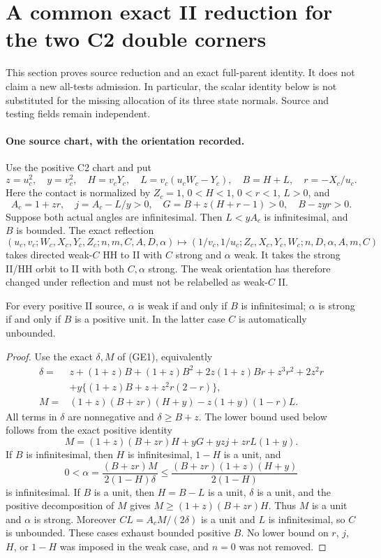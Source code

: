 \section{A common exact II reduction for the two C2 double corners}
\label{sec:r6-c2-double}

This section proves source reduction and an exact full-parent identity.
It does not claim a new all-tests admission.  In particular, the scalar
identity below is not substituted for the missing allocation of its
three state normals.  Source and testing fields remain independent.

\paragraph{One source chart, with the orientation recorded.}
Use the positive C2 chart and put
\[
 z=u_c^2,\quad y=v_c^2,\quad H=v_cY_c,\quad
 L=v_c(u_cW_c-Y_c),\quad B=H+L,\quad r=-X_c/u_c.
\]
Here the contact is normalized by $Z_c=1$, $0<H<1$, $0<r<1$,
$L>0$, and
\[
 A_c=1+zr,\quad j=A_c-L/y>0,\quad
 G=B+z(H+r-1)>0,\quad B-zyr>0.
\]
Suppose both actual angles are infinitesimal.  Then $L<yA_c$ is
infinitesimal, and $B$ is bounded.  The exact reflection
\[
 (u_c,v_c;W_c,X_c,Y_c,Z_c;n,m,C,A,D,\alpha)
 \mapsto(1/v_c,1/u_c;Z_c,X_c,Y_c,W_c;n,D,\alpha,A,m,C)
\]
takes directed weak-$C$ HH to II with $C$ strong and $\alpha$ weak.
It takes the strong II/HH orbit to II with both $C,\alpha$ strong.
The weak orientation has therefore changed under reflection and must
not be relabelled as weak-$C$ II.

\begin{proposition}
For every positive II source, $\alpha$ is weak if and only if $B$ is
infinitesimal; $\alpha$ is strong if and only if $B$ is a positive
unit.  In the latter case $C$ is automatically unbounded.
\end{proposition}
\begin{proof}
Use the exact $\delta,M$ of (GE1), equivalently
\[
\begin{split}
 \delta={}&z+(1+z)B+(1+z)B^2+2z(1+z)Br+z^3r^2+2z^2r\\
 &+y\{(1+z)B+z+z^2r(2-r)\},\\
 M={}&(1+z)(B+zr)(H+y)-z(1+y)(1-r)L.
\end{split}
\]
All terms in $\delta$ are nonnegative and $\delta\ge B+z$.
The lower bound used below follows from the exact positive identity
\[
 M=(1+z)(B+zr)H+yG+yzj+zrL(1+y).
\]
If $B$ is infinitesimal, then $H$ is infinitesimal, $1-H$ is a unit,
and
\[
 0<\alpha=\frac{(B+zr)M}{2(1-H)\delta}
 \le\frac{(B+zr)(1+z)(H+y)}{2(1-H)}
\]
is infinitesimal.  If $B$ is a unit, then $H=B-L$ is a unit,
$\delta$ is a unit, and the positive decomposition of $M$ gives
$M\ge(1+z)(B+zr)H$.  Thus $M$ is a unit and $\alpha$ is strong.
Moreover $CL=A_cM/(2\delta)$ is a unit and $L$ is infinitesimal,
so $C$ is unbounded.  These cases exhaust bounded positive $B$.
No lower bound on $r$, $j$, $H$, or $1-H$ was imposed in the weak
case, and $n=0$ was not removed.
\end{proof}

